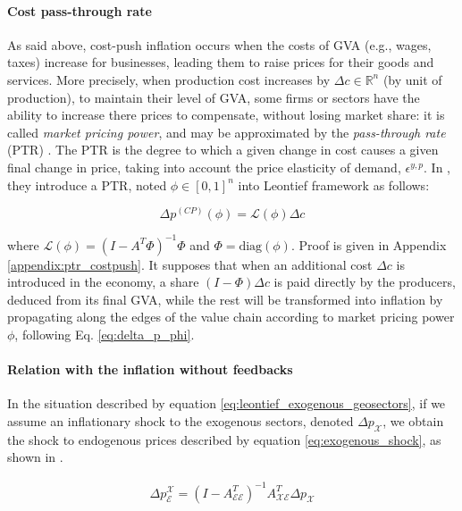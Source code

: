 \documentclass{article}
\begin{document}
\paragraph{Cost pass-through rate} As said above, cost-push inflation occurs when the costs of GVA (e.g., wages, taxes) increase for businesses, leading them to raise prices for their goods and services. More precisely, when production cost increases by $\Delta c \in \mathbb{R}^n$ (by unit of production), to maintain their level of GVA, some firms or sectors have the ability to increase there prices to compensate, without losing market share: it is called \textit{market pricing power}, and may be approximated by the \textit{pass-through rate} (PTR) \cite{brissimis2007market}. The PTR is the degree to which a given change in cost causes a given final change in price, taking into account the price elasticity of demand,  $\epsilon^{y,p}$. In \cite{desnos2023climate}, they introduce a PTR, noted $\phi \in [0,1]^n$ into Leontief framework as follows:

\begin{equation}
    \Delta p^{(CP)}(\phi) = \mathcal{L}(\phi)\Delta c
\label{eq:delta_p_phi}
\end{equation}

\noindent where $\mathcal{L}(\phi)=\left(I - A^T \Phi\right)^{-1} \Phi$ and $\Phi=\text{diag}(\phi)$. Proof is given in Appendix \ref{appendix:ptr_costpush}. It supposes that when an additional cost $\Delta c$ is introduced in the economy, a share $(I-\Phi) \Delta c$ is paid directly by the producers, deduced from its final GVA, while the rest will be transformed into inflation by propagating along the edges of the value chain according to market pricing power $\phi$, following Eq. \eqref{eq:delta_p_phi}. 

\vspace{0.1cm}

\paragraph{Relation with the inflation without feedbacks} In the situation described by equation \eqref{eq:leontief_exogenous_geosectors}, if we assume an inflationary shock to the exogenous sectors, denoted $\Delta p_\mathcal{X}$, we obtain the shock to endogenous prices described by equation \eqref{eq:exogenous_shock}, as shown in \cite {weber2024inflation}.

\begin{align}
    \Delta p_\mathcal{E}^\mathcal{X} = \left( I - A_{\mathcal{EE}}^T \right)^{-1} A_{\mathcal{XE}}^T \Delta p_\mathcal{X}
\label{eq:exogenous_shock}
\end{align}
\end{document}
